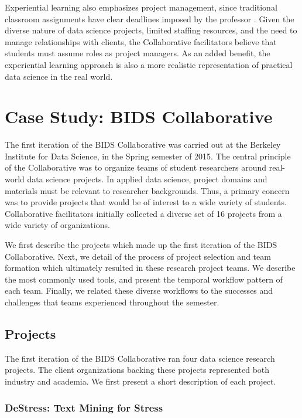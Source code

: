 \documentclass[12pt]{article}
\begin{document}
Experiential learning also emphasizes project management, since traditional classroom assignments have clear deadlines imposed by the professor \citep{mok2014teaching}. Given the diverse nature of data science projects, limited staffing resources, and the need to manage relationships with clients, the Collaborative facilitators believe that students must assume roles as project managers.  As an added benefit, the experiential learning approach is also a more realistic representation of practical data science in the real world.



\section{Case Study: BIDS Collaborative}

The first iteration of the BIDS Collaborative was carried out at the Berkeley Institute for Data Science, in the Spring semester of 2015.  The central principle of the Collaborative was to organize teams of student researchers around real-world data science projects. In applied data science, project domains and materials must be relevant to researcher backgrounds. Thus, a primary concern was to provide projects that would be of interest to a wide variety of students.  Collaborative facilitators initially collected a diverse set of 16 projects from a wide variety of organizations.

We first describe the projects which made up the first iteration of the BIDS Collaborative.  Next, we detail of the process of project selection and team formation which ultimately resulted in these research project teams.  We describe the most commonly used tools, and present the temporal workflow pattern of each team.  Finally, we related these diverse workflows to the successes and challenges that teams experienced throughout the semester.

\subsection{Projects}

The first iteration of the BIDS Collaborative ran four data science research projects.  The client organizations backing these projects represented both industry and academia.  We first present a short description of each project.

\subsubsection*{DeStress: Text Mining for Stress}
\end{document}
